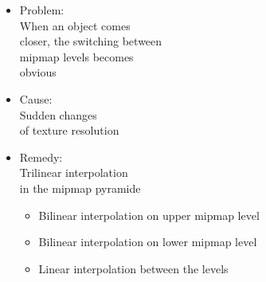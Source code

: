 \documentclass[utf8,stillsansserifmath,fleqn,t]{beamer}
\begin{document}
\begin{frame}[label=texture-mipmap-trilinear]
\begin{itemize}
\item Problem:\\ When an object comes\\
closer, the switching between\\
mipmap levels becomes\\ obvious
\item Cause: \\ Sudden changes\\ of texture resolution
\item<6> Remedy:\\
    Trilinear interpolation\\
    in the mipmap pyramide
    \begin{itemize}
    \item Bilinear interpolation on upper mipmap level
    \item Bilinear interpolation on lower mipmap level
    \item Linear interpolation between the levels
    \end{itemize}
\end{itemize}
\end{frame}
\end{document}
